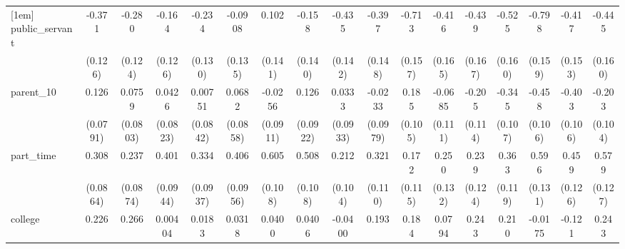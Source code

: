 {\begin{tabular}{l*{16}{c}}
[1em]
public\_servant      &      -0.371\sym{**} &      -0.280\sym{*}  &      -0.164         &      -0.234         &     -0.0908         &       0.102         &      -0.158         &      -0.435\sym{**} &      -0.397\sym{**} &      -0.713\sym{***}&      -0.416\sym{*}  &      -0.439\sym{**} &      -0.525\sym{**} &      -0.798\sym{***}&      -0.417\sym{**} &      -0.445\sym{**} \\
                    &     (0.126)         &     (0.124)         &     (0.126)         &     (0.130)         &     (0.135)         &     (0.141)         &     (0.140)         &     (0.142)         &     (0.148)         &     (0.157)         &     (0.165)         &     (0.167)         &     (0.160)         &     (0.159)         &     (0.153)         &     (0.160)         \\
[1em]
parent\_10           &       0.126         &      0.0759         &      0.0426         &     0.00751         &      0.0682         &     -0.0256         &       0.126         &      0.0333         &     -0.0233         &       0.185         &     -0.0685         &      -0.205         &      -0.345\sym{**} &      -0.458\sym{***}&      -0.403\sym{***}&      -0.203         \\
                    &    (0.0791)         &    (0.0803)         &    (0.0823)         &    (0.0842)         &    (0.0858)         &    (0.0911)         &    (0.0922)         &    (0.0933)         &    (0.0979)         &     (0.105)         &     (0.111)         &     (0.114)         &     (0.107)         &     (0.106)         &     (0.106)         &     (0.104)         \\
[1em]
part\_time           &       0.308\sym{***}&       0.237\sym{**} &       0.401\sym{***}&       0.334\sym{***}&       0.406\sym{***}&       0.605\sym{***}&       0.508\sym{***}&       0.212\sym{*}  &       0.321\sym{**} &       0.172         &       0.250         &       0.239         &       0.363\sym{**} &       0.596\sym{***}&       0.459\sym{***}&       0.579\sym{***}\\
                    &    (0.0864)         &    (0.0874)         &    (0.0944)         &    (0.0937)         &    (0.0956)         &     (0.108)         &     (0.108)         &     (0.104)         &     (0.110)         &     (0.115)         &     (0.132)         &     (0.124)         &     (0.119)         &     (0.131)         &     (0.126)         &     (0.127)         \\
[1em]
college             &       0.226\sym{*}  &       0.266\sym{**} &     0.00404         &      0.0183         &      0.0318         &      0.0400         &      0.0406         &     -0.0400         &       0.193         &       0.184         &      0.0794         &       0.243         &       0.210         &     -0.0175         &      -0.121         &       0.243         \\

\end{tabular}}
